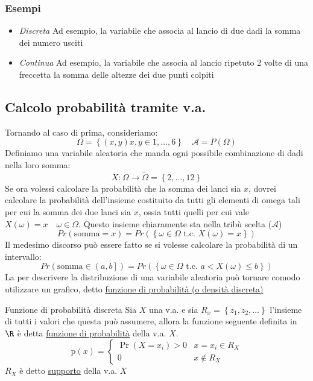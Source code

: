 \subsubsection*{Esempi}
\begin{itemize}
	\item \textit{Discreta} Ad esempio, la variabile che associa al lancio di due dadi la somma dei numero usciti
	\item \textit{Continua} Ad esempio, la variabile che associa al lancio ripetuto 2 volte di una freccetta la somma delle altezze dei due punti colpiti
\end{itemize}
\subsection{Calcolo probabilità tramite v.a.}
Tornando al caso di prima, consideriamo:
\[
	\Omega = \left\{\left(x, y\right) x,y \in 1,\ldots ,6\right\} \quad \mathcal{A} = P\left(\Omega\right)
\]
Definiamo una variabile aleatoria che manda ogni possibile combinazione di dadi nella loro somma:
\[
	X: \Omega \to  \tilde{\Omega } = \left\{2, \ldots ,12\right\}
\]
Se ora volessi calcolare la probabilità che la somma dei lanci sia $ x $, dovrei calcolare la probabilità dell'insieme costituito da tutti gli elementi di omega tali per cui la somma dei due lanci sia $ x $, ossia tutti quelli per cui vale $ X\left(\omega \right) = x \quad \omega  \in \Omega$. Questo insieme chiaramente sta nella tribù scelta ($ \mathcal{A} $)
\[
	Pr\left( \text{somma} = x\right) = Pr\left(\left\{\omega \in \Omega \text{ t.c. } X\left(\omega \right) = x\right\}\right)
\]
Il medesimo discorso può essere fatto se si volesse calcolare la probabilità di un intervallo:
\[
	Pr\left( \text{somma} \in \left(a,b\right] \right) = Pr\left(\left\{\omega \in \Omega \text{ t.c. } a < X\left(\omega \right) \le b \right\}\right)
\]
La per descrivere la distribuzione di una variabile aleatoria può tornare comodo utilizzare un grafico, detto \underline{funzione di probabilità (o densità discreta)}
\begin{definizione}{Funzione di probabilità discreta}
	Sia $ X $ una v.a. e sia $ R_x = \left\{z_1,z_2,\ldots \right\} $ l'insieme di tutti i valori che questa può assumere, allora la funzione seguente definita in $ \R  $ è detta \underline{funzione di probabilità} della v.a. $ X $.
	\[
		\mathrm{p}(x)=
		\begin{cases}
			\Pr\left(X=x_i\right)>0 & x=x_i \in R_X \\
			0                       & x \notin R_X
		\end{cases}
	\]
	$ R_X $ è detto \underline{supporto} della v.a. $ X $
\end{definizione}
